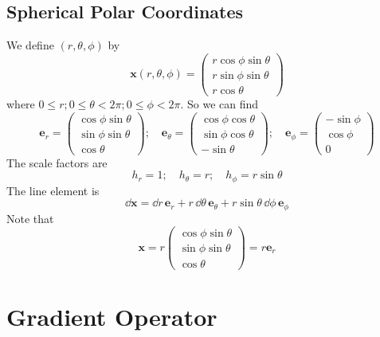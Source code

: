 \documentclass{article}
\begin{document}
\subsection{Spherical Polar Coordinates}
We define $(r, \theta, \phi)$ by
\[ \bm x(r, \theta, \phi) = \begin{pmatrix}
        r \cos \phi \sin \theta \\
        r \sin \phi \sin \theta \\
        r \cos \theta
    \end{pmatrix} \]
where $0 \leq r; 0 \leq \theta < 2 \pi; 0 \leq \phi < 2 \pi$. So we can find
\[ \bm e_r = \begin{pmatrix}
        \cos \phi \sin \theta \\ \sin \phi \sin \theta \\ \cos \theta
    \end{pmatrix};\quad \bm e_\theta = \begin{pmatrix}
        \cos \phi \cos \theta \\ \sin \phi \cos \theta \\ -\sin \theta
    \end{pmatrix};\quad \bm e_\phi = \begin{pmatrix}
        -\sin \phi \\ \cos \phi \\ 0
    \end{pmatrix} \]
The scale factors are
\[ h_r = 1;\quad h_\theta = r;\quad h_\phi = r \sin \theta \]
The line element is
\[ \dd \bm x = \dd r \, \bm e_r + r \, \dd \theta \, \bm e_\theta + r \sin \theta \, \dd \phi \, \bm e_\phi \]
Note that
\[ \bm x = r \begin{pmatrix}
        \cos \phi \sin \theta \\ \sin \phi \sin \theta \\ \cos \theta
    \end{pmatrix} = r \bm e_r \]

\section{Gradient Operator}
\end{document}
